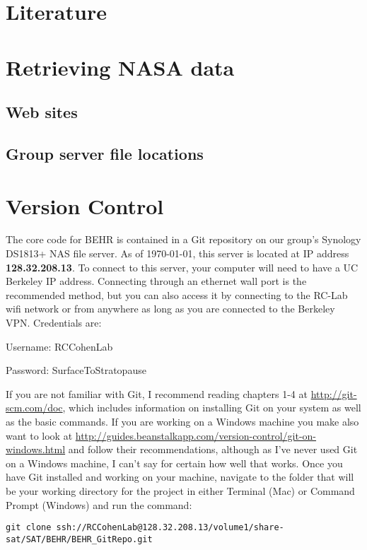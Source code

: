 \documentclass[12pt]{article}
\begin{document}
\section{Literature}

\section{Retrieving NASA data}
	\subsection{Web sites}
	\subsection{Group server file locations}

\section{Version Control}
	
	The core code for BEHR is contained in a Git repository on our group's Synology DS1813+ NAS file server.  As of \today, this server is located at IP address \textbf{128.32.208.13}.  To connect to this server, your computer will need to have a UC Berkeley IP address.  Connecting through an ethernet wall port is the recommended method, but you can also access it by connecting to the RC-Lab wifi network or from anywhere as long as you are connected to the Berkeley VPN.  Credentials are:
	
	\vspace{12pt}
	Username: RCCohenLab
	
	Password: SurfaceToStratopause
	
	\vspace{12pt}
	If you are not familiar with Git, I recommend reading chapters 1-4 at \url{http://git-scm.com/doc}, which includes information on installing Git on your system as well as the basic commands.  If you are working on a Windows machine you make also want to look at \url{http://guides.beanstalkapp.com/version-control/git-on-windows.html} and follow their recommendations, although as I've never used Git on a Windows machine, I can't say for certain how well that works.  
	Once you have Git installed and working on your machine, navigate to the folder that will be your working directory for the project in either Terminal (Mac) or Command Prompt (Windows) and run the command:

\vspace{12pt}
	\begin{sloppypar}
\noindent\lstinline[breaklines=true]|git clone ssh://RCCohenLab@128.32.208.13/volume1/share-sat/SAT/BEHR/BEHR_GitRepo.git|
	\end{sloppypar}
	
\end{document}
